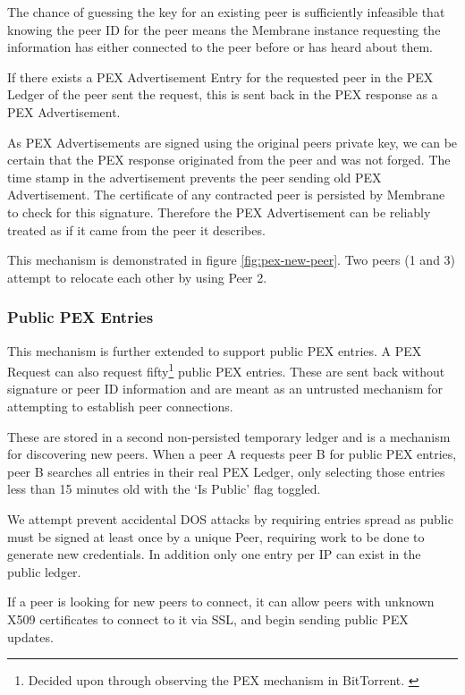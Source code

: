 \documentclass[11pt, a4paper, twocolumn, twoside]{report}
\begin{document}
The chance of guessing the key for an existing peer is sufficiently infeasible that knowing the peer ID for the peer means the Membrane instance requesting the information has either connected to the peer before or has heard about them.

If there exists a PEX Advertisement Entry for the requested peer in the PEX Ledger of the peer sent the request, this is sent back in the PEX response as a PEX Advertisement.

As PEX Advertisements are signed using the original peers private key, we can be certain that the PEX response originated from the peer and was not forged. \citep{li1993remark} The time stamp in the advertisement prevents the peer sending old PEX Advertisement. The certificate of any contracted peer is persisted by Membrane to check for this signature. Therefore the PEX Advertisement can be reliably treated as if it came from the peer it describes.

This mechanism is demonstrated in figure \ref{fig:pex-new-peer}. Two peers (1 and 3) attempt to relocate each other by using Peer 2.

\subsubsection{Public PEX Entries}

This mechanism is further extended to support public PEX entries. A PEX Request can also request fifty\footnote{Decided upon through observing the PEX mechanism in BitTorrent. \citep{vuze2010vuze}} public PEX entries. These are sent back without signature or peer ID information and are meant as an untrusted mechanism for attempting to establish peer connections.

These are stored in a second non-persisted temporary ledger and is a mechanism for discovering new peers. When a peer A requests peer B for public PEX entries, peer B searches all entries in their real PEX Ledger, only selecting those entries less than 15 minutes old with the `Is Public' flag toggled.

We attempt prevent accidental DOS attacks by requiring entries spread as public must be signed at least once by a unique Peer, requiring work to be done to generate new credentials. In addition only one entry per IP can exist in the public ledger.

If a peer is looking for new peers to connect, it can allow peers with unknown X509 certificates to connect to it via SSL, and begin sending public PEX updates.
\end{document}
